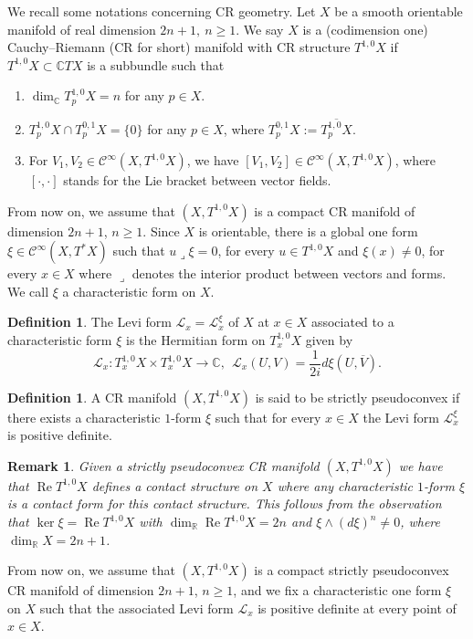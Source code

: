 \documentclass[12pt]{amsart}
\newtheorem{remark}[theorem]{Remark}
\theoremstyle{definition}
\newtheorem{definition}[theorem]{Definition}
\theoremstyle{named}
\numberwithin{equation}{subsection}
\newcommand{\ol}{\overline}
\newcommand{\R}{\mathbb{R}}
\newcommand{\C}{\mathbb{C}}
\def\cC{\mathscr{C}}
\begin{document}
We recall some notations concerning CR geometry. Let $X$ be a smooth orientable manifold of real dimension $2n+1,~n\geq 1$. 
We say $X$ is a (codimension one) Cauchy--Riemann (CR for short) 
manifold with CR structure \(T^{1,0}X\) if 
$T^{1,0}X\subset\mathbb{C}TX$ is a subbundle such that
\begin{enumerate}
\item[(i)] $\dim_{\mathbb{C}}T^{1,0}_{p}X=n$ for any $p\in X$.
\item[(ii)] $T^{1,0}_p X\cap T^{0,1}_p X=\{0\}$ for any $p\in X$, where 
$T^{0,1}_p X:=\overline{T^{1,0}_p X}$.
\item[(iii)] For $V_1, V_2\in \mathscr{C}^{\infty}(X,T^{1,0}X)$, 
we have $[V_1,V_2]\in\mathscr{C}^{\infty}(X,T^{1,0}X)$, where 
$[\cdot,\cdot]$ stands for the Lie bracket between vector fields. 
\end{enumerate}

From now on, we assume that $(X,T^{1,0}X)$ is a compact CR manifold of dimension $2n+1$, $n\geq1$. Since $X$ is orientable, there is a global one form $\xi\in\cC^\infty(X,T^*X)$ such that $u\lrcorner\xi=0$, for every $u\in T^{1,0}X$ and $\xi(x)\neq0$, for every $x\in X$ where \(\lrcorner\) denotes the interior product between vectors and forms. We call $\xi$ a characteristic form on $X$.

\begin{definition}\label{D:Leviform}
The Levi form $\mathcal{L}_x=\mathcal{L}^{\xi}_x$ of $X$ at $x\in X$ 
associated to a characteristic form $\xi$ is the  Hermitian form on $T^{1,0}_xX$ given by 
\begin{equation}\label{eq:2.12b}
\mathcal{L}_x:T^{1,0}_xX\times T^{1,0}_xX\to\C,
\:\: \mathcal{L}_x(U,V)=\frac{1}{2i}d\xi(U, \ol V).
\end{equation}  
\end{definition}

\begin{definition}\label{d-gue241119yydq}
A CR manifold $(X,T^{1,0}X)$ is said to be  strictly pseudoconvex if 
there exists a characteristic $1$-form $\xi$
such that for every $x\in X$ the Levi form
$\mathcal{L}^{\xi}_x$ is positive definite. 
\end{definition} 
\begin{remark}
 Given a  strictly pseudoconvex CR manifold $(X,T^{1,0}X)$ we have that \(\operatorname{Re}T^{1,0}X\) defines a contact structure on \(X\) where any characteristic $1$-form $\xi$ is a contact form for this contact structure. This follows from the observation that \(\ker \xi=\operatorname{Re}T^{1,0}X\) with \(\dim_\R \operatorname{Re}T^{1,0}X=2n\) and $\xi\wedge(d\xi)^n\neq 0$, where $\dim_\R X=2n+1$.
\end{remark}
From now on, we assume that $(X,T^{1,0}X)$ is a compact strictly pseudoconvex CR manifold of dimension $2n+1$, $n\geq1$, and we fix a characteristic one form $\xi$ on $X$ such that the associated Levi form $\mathcal{L}_x$ is positive definite at every point of $x\in X$.  
\end{document}
